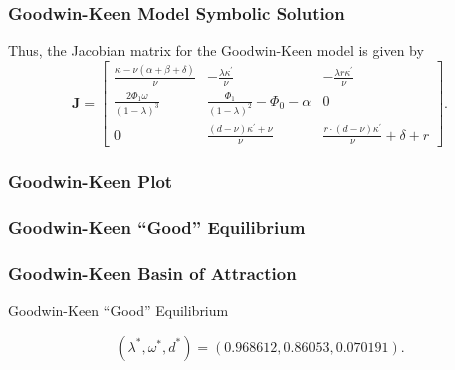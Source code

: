 \documentclass{beamer}
\begin{document}
\begin{frame}
\frametitle{Goodwin-Keen Model Symbolic Solution}
Thus, the Jacobian matrix for the Goodwin-Keen model is given by
\begin{equation} \label{eq:jac_keen}
    \mathbf J = %
    \begin{bmatrix}
        \frac{\kappa-\nu(\alpha+\beta+\delta)}{\nu} & -\frac{\lambda\kappa^\prime}{\nu} & -\frac{\lambda r\kappa^\prime}{\nu} \\[0.5em]
        \frac{2\Phi_1\omega}{(1-\lambda)^3} & \frac{\Phi_1}{(1-\lambda)^2}-\Phi_0-\alpha & 0\\[0.5em]
        0 & \frac{(d-\nu)\kappa^\prime+\nu}{\nu} & \frac{r\cdot(d-\nu)\kappa^\prime}{\nu}+ \delta + r
    \end{bmatrix}.
\end{equation}
\end{frame}
\begin{frame}
\frametitle{Goodwin-Keen Plot}
\begin{center}
\label{frequencyGraph}

\end{center}
\end{frame}
\begin{frame}
\frametitle{Goodwin-Keen ``Good'' Equilibrium}
\begin{center}
\label{frequencyGraph}

\end{center}
\end{frame}
\begin{frame}
\frametitle{Goodwin-Keen Basin of Attraction}
\begin{center}
\label{frequencyGraph}

\end{center}
\end{frame}
\begin{frame}{Goodwin-Keen ``Good'' Equilibrium}
    \begin{figure}
        
    \end{figure}
    \begin{equation*}
        (\lambda^\ast, \omega^\ast, d^\ast) = (0.968612, 0.86053, 0.070191).
    \end{equation*}
\end{frame}
\end{document}
